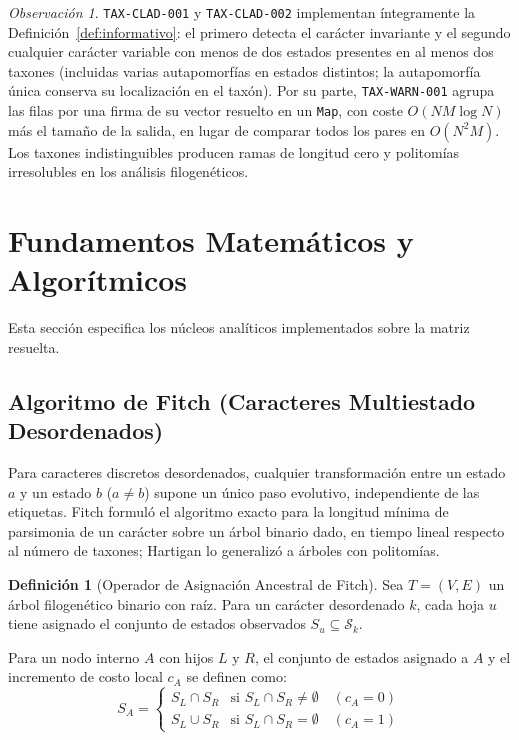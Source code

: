 \documentclass[11pt,a4paper]{article}
\theoremstyle{definition}
\newtheorem{definicion}{Definición}[section]
\theoremstyle{remark}
\newtheorem*{observacion}{Observación}
\begin{document}
\begin{observacion}
\texttt{TAX-CLAD-001} y \texttt{TAX-CLAD-002} implementan íntegramente la Definición~\ref{def:informativo}: el primero detecta el carácter invariante y el segundo cualquier carácter variable con menos de dos estados presentes en al menos dos taxones (incluidas varias autapomorfías en estados distintos; la autapomorfía única conserva su localización en el taxón). Por su parte, \texttt{TAX-WARN-001} agrupa las filas por una firma de su vector resuelto en un \texttt{Map}, con coste $O(NM\log N)$ más el tamaño de la salida, en lugar de comparar todos los pares en $O(N^2 M)$. Los taxones indistinguibles producen ramas de longitud cero y politomías irresolubles en los análisis filogenéticos.
\end{observacion}

\section{Fundamentos Matemáticos y Algorítmicos}
\label{sec:algoritmos}

Esta sección especifica los núcleos analíticos implementados sobre la matriz resuelta.

\subsection{Algoritmo de Fitch (Caracteres Multiestado Desordenados)}
\label{sec:fitch}
Para caracteres discretos desordenados, cualquier transformación entre un estado $a$ y un estado $b$ ($a \neq b$) supone un único paso evolutivo, independiente de las etiquetas. Fitch \cite{fitch1971} formuló el algoritmo exacto para la longitud mínima de parsimonia de un carácter sobre un árbol binario dado, en tiempo lineal respecto al número de taxones; Hartigan \cite{hartigan1973} lo generalizó a árboles con politomías.

\begin{definicion}[Operador de Asignación Ancestral de Fitch]
Sea $T = (V, E)$ un árbol filogenético binario con raíz. Para un carácter desordenado $k$, cada hoja $u$ tiene asignado el conjunto de estados observados $S_u \subseteq \mathcal{S}_k$.

Para un nodo interno $A$ con hijos $L$ y $R$, el conjunto de estados asignado a $A$ y el incremento de costo local $c_A$ se definen como:
\begin{equation}
\label{eq:fitch}
S_A = \begin{cases}
S_L \cap S_R & \text{si } S_L \cap S_R \neq \emptyset \quad (c_A = 0) \\
S_L \cup S_R & \text{si } S_L \cap S_R = \emptyset \quad (c_A = 1)
\end{cases}
\end{equation}
\end{definicion}
\end{document}
